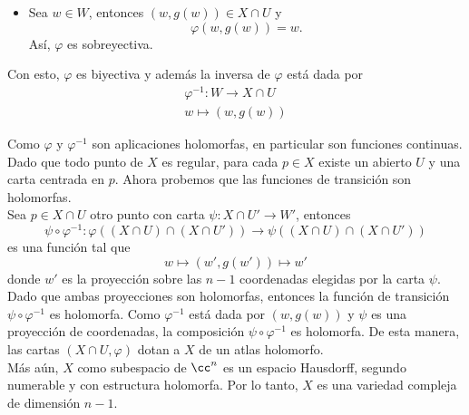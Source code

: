 \begin{example}
\begin{itemize}
    		\begin{align*}
    			\varphi(x)&=\varphi(x')\\
    			w&=w'
    		\end{align*}
    		De esta forma, $z=z'$ y por tanto $x=x'$. Esto significa que $\varphi$ es inyectiva.
    		\item Sea $w\in W$, entonces $(w,g(w))\in X\cap U$ y
    		\begin{equation*}
    			\varphi(w,g(w))=w.
    		\end{equation*}
    		Así, $\varphi$ es sobreyectiva.
    	\end{itemize}
    	Con esto, $\varphi$ es biyectiva y además la inversa de $\varphi$ está dada por
    	\begin{align*}
    		\varphi^{-1}:W\to X\cap U\\
    		w\mapsto (w,g(w))
    	\end{align*}
 
    	Como $\varphi$ y $\varphi^{-1}$ son aplicaciones holomorfas, en particular son funciones continuas.
    	Dado que todo punto de $X$ es regular, para cada $p\in X$ existe un abierto $U$ y una carta centrada en $p$. Ahora probemos que las funciones de transición son holomorfas.\\
    	Sea $p\in X\cap U$ otro punto con carta $\psi:X\cap U'\to W'$, entonces
    	\begin{equation*}
    		\psi\circ\varphi^{-1}:\varphi((X\cap U)\cap(X\cap U'))\to\psi((X\cap U)\cap(X\cap U'))
    	\end{equation*}
    	es una función tal que 
    	\begin{equation*}
    		w\mapsto (w',g(w'))\mapsto w'
    	\end{equation*}
    	donde $w'$ es la proyección sobre las $n-1$ coordenadas elegidas por la carta $\psi$. Dado que ambas proyecciones son holomorfas, entonces la función de transición $\psi\circ\varphi^{-1}$ es holomorfa. Como $\varphi^{-1}$ está dada por $(w,g(w))$ y $\psi$ es una proyección de coordenadas, la composición $\psi\circ\varphi^{-1}$ es holomorfa.
    	De esta manera, las cartas $(X\cap U,\varphi)$ dotan a $X$ de un atlas holomorfo.\\
    	Más aún, $X$ como subespacio de $\cc^n$ es un espacio Hausdorff, segundo numerable y con estructura holomorfa. Por lo tanto, $X$ es una variedad compleja de dimensión $n-1$.
    \end{example}


